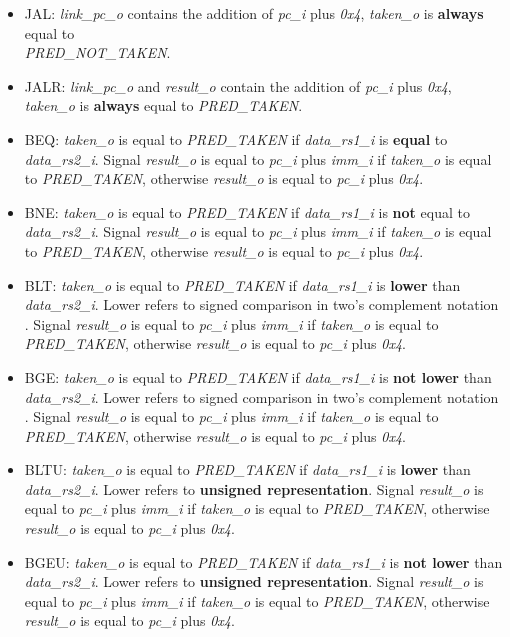\begin{itemize}
  \item JAL: \emph{link\_pc\_o} contains the addition of \emph{pc\_i} plus \emph{0x4}, \emph{taken\_o} is \textbf{always} equal to \\ \emph{PRED\_NOT\_TAKEN}.
  \item JALR: \emph{link\_pc\_o} and \emph{result\_o} contain the addition of \emph{pc\_i} plus \emph{0x4}, \emph{taken\_o} is \textbf{always} equal to \emph{PRED\_TAKEN}.
  \item BEQ: \emph{taken\_o} is equal to \emph{PRED\_TAKEN} if \emph{data\_rs1\_i} is \textbf{equal} to \emph{data\_rs2\_i}. Signal \emph{result\_o} is equal to \emph{pc\_i} plus  \emph{imm\_i} if \emph{taken\_o} is equal to \emph{PRED\_TAKEN}, otherwise \emph{result\_o} is equal to \emph{pc\_i} plus \emph{0x4}.
  \item BNE: \emph{taken\_o} is equal to \emph{PRED\_TAKEN} if \emph{data\_rs1\_i} is \textbf{not} equal to \emph{data\_rs2\_i}. Signal \emph{result\_o} is equal to \emph{pc\_i} plus  \emph{imm\_i} if \emph{taken\_o} is equal to \emph{PRED\_TAKEN}, otherwise \emph{result\_o} is equal to \emph{pc\_i} plus \emph{0x4}.
  \item BLT: \emph{taken\_o} is equal to \emph{PRED\_TAKEN} if \emph{data\_rs1\_i} is \textbf{lower} than \emph{data\_rs2\_i}. Lower refers to signed comparison in two’s complement notation . Signal \emph{result\_o} is equal to \emph{pc\_i} plus  \emph{imm\_i} if \emph{taken\_o} is equal to \emph{PRED\_TAKEN}, otherwise \emph{result\_o} is equal to \emph{pc\_i} plus \emph{0x4}.
  \item BGE: \emph{taken\_o} is equal to \emph{PRED\_TAKEN} if \emph{data\_rs1\_i} is \textbf{not lower} than \emph{data\_rs2\_i}. Lower refers to signed comparison in two’s complement notation . Signal \emph{result\_o} is equal to \emph{pc\_i} plus  \emph{imm\_i} if \emph{taken\_o} is equal to \emph{PRED\_TAKEN}, otherwise \emph{result\_o} is equal to \emph{pc\_i} plus \emph{0x4}.
  \item BLTU: \emph{taken\_o} is equal to \emph{PRED\_TAKEN} if \emph{data\_rs1\_i} is \textbf{lower} than \emph{data\_rs2\_i}. Lower refers to \textbf{unsigned representation}. Signal \emph{result\_o} is equal to \emph{pc\_i} plus  \emph{imm\_i} if \emph{taken\_o} is equal to \emph{PRED\_TAKEN}, otherwise \emph{result\_o} is equal to \emph{pc\_i} plus \emph{0x4}.
  \item BGEU: \emph{taken\_o} is equal to \emph{PRED\_TAKEN} if \emph{data\_rs1\_i} is \textbf{not lower} than \emph{data\_rs2\_i}. Lower refers to \textbf{unsigned representation}. Signal \emph{result\_o} is equal to \emph{pc\_i} plus  \emph{imm\_i} if \emph{taken\_o} is equal to \emph{PRED\_TAKEN}, otherwise \emph{result\_o} is equal to \emph{pc\_i} plus \emph{0x4}.
\end{itemize}

